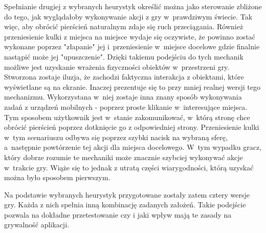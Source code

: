 \documentclass[a4paper,12pt,numbers=noenddot]{report}
\begin{document}
Spełnianie drugiej z wybranych heurystyk określić można jako sterowanie zbliżone do tego, jak wyglądałoby wykonywanie akcji z gry w~prawdziwym świecie. Tak więc, aby obrócić pierścień naturalnym zdaje się ruch przeciągania. Również przeniesienie kulki z miejsca na miejsce wydaje się oczywiste, że powinno zostać wykonane poprzez "złapanie" jej i~przeniesienie w~miejsce docelowe gdzie finalnie nastąpić może jej "upuszczenie". Dzięki takiemu podejściu do tych mechanik możliwe jest uzyskanie wrażenia fizyczności obiektów w~przestrzeni gry. Stworzona zostaje iluzja, że zachodzi faktyczna interakcja z obiektami, które wyświetlane są na ekranie. Inaczej prezentuje się to przy mniej realnej wersji tego mechanizmu. Wykorzystana w~niej zostaje inna znany sposób wykonywania zadań z urządzeń mobilnych - poprzez proste klikanie w~interesujące miejsca. Tym sposobem użytkownik jest w~stanie zakomunikować, w~którą stronę chce obrócić pierścień poprzez dotknięcie go z odpowiedniej strony. Przeniesienie kulki w~tym scenariuszu odbywa się poprzez szybki nacisk na wybraną sferę, a~następnie powtórzenie tej akcji dla miejsca docelowego. W~tym wypadku gracz, który dobrze rozumie te mechaniki może znacznie szybciej wykonywać akcje w~trakcie gry. Wiąże się to jednak z utratą części wiarygodności, którą uzyskać można było sposobem pierwszym.

Na podstawie wybranych heurystyk przygotowane zostały zatem cztery wersje gry. Każda z nich spełnia inną kombinację zadanych założeń. Takie podejście pozwala na dokładne przetestowanie czy i jaki wpływ mają te zasady na grywalność aplikacji. 
\end{document}
